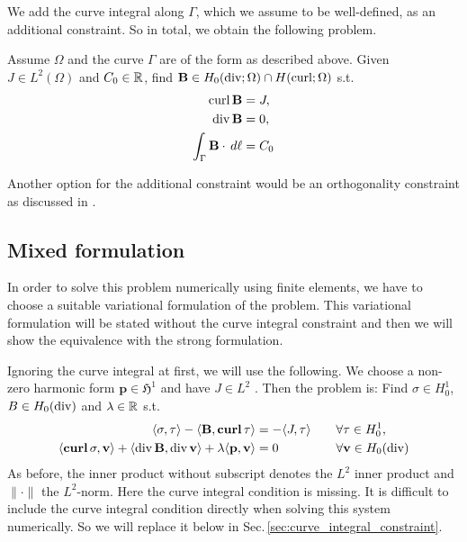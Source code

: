 \documentclass[../master_thesis.tex]{subfiles}
\begin{document}
We add the curve integral along $\Gamma$, which we 
assume to be well-defined, as an additional constraint.
So in total, we obtain the following problem.
\begin{problem}\label{prob:2d_magnetostatic_problem}
    Assume $\Omega$ and the curve $\Gamma$ are of the form as described above.
    Given $J \in L^2(\Omega)$ and $C_0 \in \mathbb{R}$, find $\mathbf{B} \in H_0(\operatorname{div};\Omega) 
    \cap H(\operatorname{curl};\Omega)$ s.t.
    \begin{align*}
        \operatorname{curl} \mathbf{B} &= J, 
        \\ \operatorname{div} \mathbf{B} &= 0,
        \\ \int_\Gamma \mathbf{B} \cdot \, d\ell &= C_0
    \end{align*}
\end{problem}

Another option for the additional constraint would be an orthogonality constraint as discussed 
in \cite[Sec.\,3.5]{multipatch_paper}.

\subsection{Mixed formulation}
In order to solve this problem numerically using finite elements, we have to 
choose a suitable variational formulation of the problem. This variational formulation 
will be stated without the curve integral constraint and then we will show 
the equivalence with the strong formulation.

Ignoring the curve integral 
at first, we will use the following. We choose a non-zero harmonic form 
$\mathbf{p} \in \mathfrak{H}^1$ and have 
$J \in L^2$ . Then the problem is: Find $\sigma \in H^1_0$, 
$B \in H_0(\operatorname{div})$ and $\lambda \in \mathbb{R}$ s.t.
\begin{alignat}{2}
    \langle \sigma, \tau \rangle - \langle \mathbf{B}, \veccurl \tau \rangle 
        &=  -\langle J, \tau \rangle \quad &&\forall \tau \in H^1_0, \label{eq:first_eq_mixed_formulation}
    \\ \langle \veccurl\sigma, \mathbf{v} \rangle + \langle \diver \mathbf{B}, \diver \mathbf{v} \rangle 
        + \lambda \langle \mathbf{p}, \mathbf{v} \rangle 
        &= 0 \quad &&\forall \mathbf{v} \in H_0(\diver) \label{eq:second_eq_mixed_formulation}
\end{alignat} 
As before, the inner product without subscript denotes the $L^2$ inner product and 
$\lVert \cdot \rVert$ the $L^2$-norm.
Here the curve integral condition is missing. It is difficult to include the curve integral 
condition directly when solving this system numerically. So we will replace it below 
in Sec.\,\ref{sec:curve_integral_constraint}.
\end{document}
